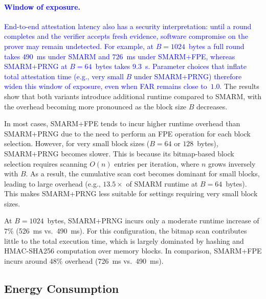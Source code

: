 \documentclass[journal]{IEEEtran}
\newcommand\ben[1]{\textcolor{blue}{#1}}
\newcommand{\rtsmarmone}{SMARM+PRNG\xspace}
\newcommand{\rtsmarmtwo}{SMARM+FPE\xspace}
\begin{document}
\paragraph{\ben{Window of exposure.}}
\ben{End-to-end attestation latency also has a security interpretation: until a round completes and the verifier accepts fresh evidence, software compromise on the prover may remain undetected.
For example, at $B = 1024$~bytes a full round takes $490$~ms under SMARM and $726$~ms under \rtsmarmtwo, whereas \rtsmarmone at $B = 64$~bytes takes $9.3$~s.
Parameter choices that inflate total attestation time (e.g., very small $B$ under \rtsmarmone) therefore widen this window of exposure, even when FAR remains close to~$1.0$.}
The results show that both variants introduce additional runtime compared to SMARM, with the overhead becoming more pronounced as the block size $B$ decreases.



In most cases, \rtsmarmtwo tends to incur higher runtime overhead than \rtsmarmone due to the need to perform an FPE operation for each block selection.
However, for very small block sizes ($B = 64$ or $128$~bytes), \rtsmarmone becomes slower.
This is because its bitmap-based block selection requires scanning $O(n)$ entries per iteration, where $n$ grows inversely with $B$.
As a result, the cumulative scan cost becomes dominant for small blocks, leading to large overhead (e.g., $13.5\times$ of SMARM runtime at $B = 64$~bytes).
This makes \rtsmarmone less suitable for settings requiring very small block sizes.

At $B = 1024$~bytes, \rtsmarmone incurs only a moderate runtime increase of $7\%$ (526~ms vs.\ 490~ms).
For this configuration, the bitmap scan contributes little to the total execution time, which is largely dominated by hashing and HMAC-SHA256 computation over memory blocks.
%
In comparison, \rtsmarmtwo incurs around $48\%$ overhead (726~ms vs.\ 490~ms).

\subsection{Energy Consumption}
\label{sec:energy}
\end{document}
